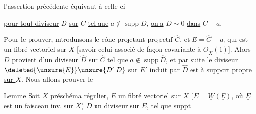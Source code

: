 l'assertion précédente équivaut à celle-ci :

\uline{pour tout diviseur} $D$ \uline{sur} $C$ \uline{tel que} $a\notin\operatorname{supp}D$, \uline{on a} $D\sim 0$ \uline{dans} $C-a$.

Pour le prouver, introduisons le cône projetant projectif $\widehat C$, et $E=\widehat C-a$, qui est un fibré vectoriel sur $X$ [savoir celui associé de façon covariante à $\underline O_X(1)$]. Alors $D$ provient d'un diviseur $\widehat D$ sur $\widehat C$ tel que $a\notin\operatorname{supp}\widehat D$, et par suite le  diviseur $\deleted{\unsure{E}}\unsure{D'|D}$ sur $E'$ induit par $\widehat D$ est \uline{à support propre} \uline{sur $X$}. Nous allons prouver le

\uline{Lemme} Soit $X$ préschéma régulier, $E$ un fibré vectoriel  sur $X$ ($E=\underline W(\underline E)$, où $\underline E$ est un faisceau inv. sur $X$) $D$ un diviseur sur $E$, tel que suppt
